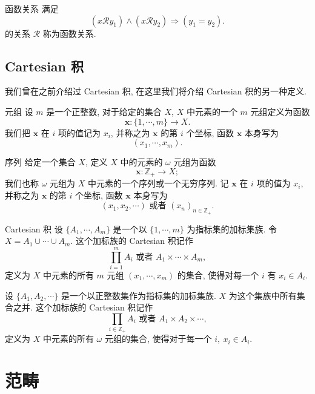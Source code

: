 \documentclass[cn,toc=twocol]{elegantbook}
\newcommand{\Z}{\mathbb{Z}}
\begin{document}
\begin{definition}{函数关系}
满足
\[
	(x \mathcal{R} y_1) \land (x \mathcal{R} y_2) \Rightarrow (y_1 = y_2).
\]
的关系 $\mathcal{R}$ 称为函数关系.
\end{definition}


\subsection{Cartesian 积}

我们曾在之前介绍过 Cartesian 积, 在这里我们将介绍 Cartesian 积的另一种定义.

\begin{definition}{元组}
设 $m$ 是一个正整数, 对于给定的集合 $X$, $X$ 中元素的一个 $m$ 元组定义为函数
\[
	\boldsymbol{x}:\{1,\cdots,m\}\to X.
\]
我们把 $\boldsymbol{x}$ 在 $i$ 项的值记为 $x_i$, 并称之为 $\boldsymbol{x}$ 的第 $i$ 个坐标, 函数 $\boldsymbol{x}$ 本身写为
\[
	(x_1,\cdots,x_m).
\] 
\end{definition}

\begin{definition}{序列}
给定一个集合 $X$, 定义 $X$ 中的元素的 $\omega$ 元组为函数
\[
	\boldsymbol{x}:\Z_+ \to X;
\]
我们也称 $\omega$ 元组为 $X$ 中元素的一个序列或一个无穷序列. 记 $\boldsymbol{x}$ 在 $i$ 项的值为 $x_i$, 并称之为 $\boldsymbol{x}$ 的第 $i$ 个坐标, 函数 $\boldsymbol{x}$ 本身写为
\[
	(x_1, x_2,\cdots) \text{  或者  } (x_n)_{n\in \Z_+}.
\]
\end{definition}

\begin{definition}{Cartesian 积}
设 $\{A_1,\cdots,A_m\}$ 是一个以 $\{1,\cdots,m\}$ 为指标集的加标集族. 令 $X = A_1 \cup \cdots \cup A_m$. 这个加标族的 Cartesian 积记作
\[
	\prod_{i=1}^m A_i \text{  或者  } A_1 \times \cdots \times A_m,
\]
定义为 $X$ 中元素的所有 $m$ 元组 $(x_1,\cdots,x_m)$ 的集合, 使得对每一个 $i$ 有 $x_i\in A_i$. 

\smallskip
设 $\{A_1,A_2,\cdots\}$ 是一个以正整数集作为指标集的加标集族. $X$ 为这个集族中所有集合之并. 这个加标族的 Cartesian 积记作
\[
	\prod_{i\in \Z_+} A_i \text{  或者  } A_1 \times A_2 \times \cdots,
\]
定义为 $X$ 中元素的所有 $\omega$ 元组的集合, 使得对于每一个 $i,\ x_i\in A_i$.
\end{definition}


\section{范畴}


\end{document}
